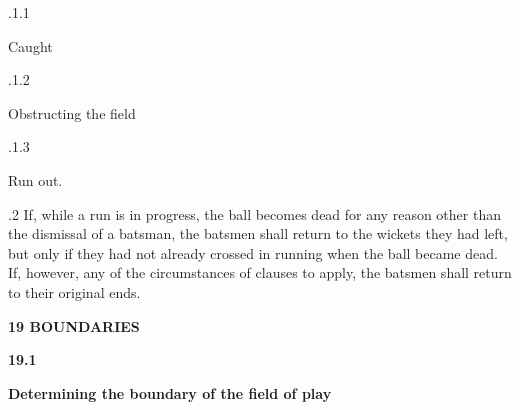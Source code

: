 \documentclass[12pt]{article}
\begin{document}
\vspace{\baselineskip}
\begin{adjustwidth}{0.49in}{0.0in}
{\fontsize{9pt}{10.8pt}.1.1 \tabto{1.17in} {\fontsize{8pt}{9.6pt}\selectfont Caught\par}\par}\par

\end{adjustwidth}


\vspace{\baselineskip}
\begin{adjustwidth}{0.49in}{0.0in}
{\fontsize{9pt}{10.8pt}.1.2 \tabto{1.17in} {\fontsize{8pt}{9.6pt}\selectfont Obstructing the field\par}\par}\par

\end{adjustwidth}


\vspace{\baselineskip}
\begin{adjustwidth}{0.49in}{0.0in}
{\fontsize{9pt}{10.8pt}.1.3 \tabto{1.17in} {\fontsize{8pt}{9.6pt}\selectfont Run out.\par}\par}\par

\end{adjustwidth}


\vspace{\baselineskip}
\begin{adjustwidth}{0.5in}{0.11in}
{\fontsize{9pt}{10.8pt}.2 If, while a run is in progress, the ball becomes dead for any reason other than the dismissal of a batsman, the batsmen shall return to the wickets they had left, but only if they had not already crossed in running when the ball became dead. If, however, any of the circumstances of clauses to apply, the batsmen shall return to their original ends.\par}\par

\end{adjustwidth}


\vspace{\baselineskip}
{\fontsize{16pt}{19.2pt}\selectfont \textbf{19 BOUNDARIES}\par}\par


\vspace{\baselineskip}
{\fontsize{11pt}{13.2pt}\selectfont \textbf{19.1 \tabto{0.47in} }{\fontsize{10pt}{12.0pt}\selectfont \textbf{Determining the boundary of the field of play}\par}\par}\par
\end{document}
